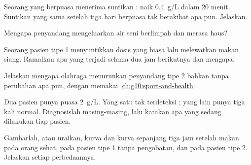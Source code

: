\begin{exercise}[$\star\star$]\label{exo:g12:glucose-and-diabetes:8}
Seorang yang berpuasa menerima suntikan :  naik
\qty{0.4}{g/L} dalam 20 menit. Suntikan yang sama setelah tiga hari
berpuasa tak berakibat apa pun. Jelaskan.
\end{exercise}

\begin{exercise}[$\star\star$]\label{exo:g12:glucose-and-diabetes:9}
Mengapa penyandang  mengeluarkan air seni berlimpah dan merasa
haus?
\end{exercise}

\begin{exercise}[$\star\star$]\label{exo:g12:glucose-and-diabetes:10}
Seorang pasien tipe 1 menyuntikkan dosis  yang biasa lalu
melewatkan makan siang. Ramalkan apa yang terjadi selama dua jam
berikutnya dan mengapa.
\end{exercise}

\begin{exercise}[$\star\star$]\label{exo:g12:glucose-and-diabetes:11}
Jelaskan mengapa olahraga menurunkan  penyandang  tipe
2 bahkan tanpa perubahan  apa pun, dengan memakai
\cref{ch:g10:sport-and-health}.
\end{exercise}

\begin{exercise}[$\star\star\star$]\label{exo:g12:glucose-and-diabetes:12}
Dua pasien punya  puasa \qty{2}{g/L}. Yang satu tak
terdeteksi ; yang lain punya  tiga kali normal.
Diagnosislah masing-masing, lalu katakan apa yang sedang dilakukan
 tiap pasien.
\end{exercise}

\begin{exercise}[$\star\star\star$]\label{exo:g12:glucose-and-diabetes:13}
Gambarlah, atau uraikan, kurva  dan kurva  sepanjang
tiga jam setelah makan pada orang sehat, pada pasien tipe 1 tanpa
pengobatan, dan pada pasien tipe 2. Jelaskan setiap perbedaannya.
\end{exercise}

